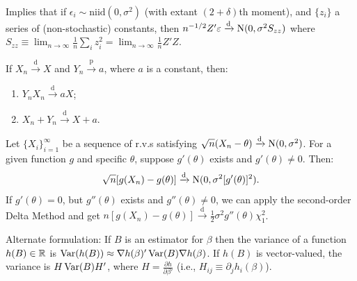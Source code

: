 \documentclass[8pt,letterpaper, landscape]{extarticle} %
\begin{document}
\begin{multicols}{3}
\begin{description}
Implies that if $ \epsilon_i \sim \text{niid} (0 , \sigma^2) $ (with extant $ (2 + \delta ) $th moment), and $ \{ z_i \} $ a series of (non-stochastic) constants, then $ n^{-1/2} Z' \varepsilon \xrightarrow{\text{d}} \operatorname{N} (0 , \sigma^2 S_{zz} ) $ where $ S_{zz} \equiv \lim_{n \to \infty} \tfrac{1}{n} \sum_{i} z_i^2 = \lim_{n \to \infty} \tfrac{1}{n} Z' Z $.

 If $ X_n \xrightarrow{\text{d}} X $ and $ Y_n \xrightarrow{\text{p}} a $, where $ a $ is a constant, then:
\begin{enumerate}
\item $ Y_n X_n \xrightarrow{\text{d}} aX $;
\item $ X_n + Y_n \xrightarrow{\text{d}} X + a $.
\end{enumerate}

Let $ \{ X_i \}_{i=1}^{\infty} $ be a sequence of r.v.s satisfying $ \sqrt{n} (X_n - \theta) \xrightarrow{\text{d}} \operatorname{N} (0, \sigma^2) $. For a given function $ g $ and specific $ \theta $, suppose $ g'(\theta) $ exists and $ g'(\theta) \neq 0 $. Then:
$$ \sqrt{n} [g(X_n) - g(\theta )] \xrightarrow{\text{d}} \operatorname{N} (0, \sigma^2 [g' (\theta)]^2). $$
If $ g'(\theta) = 0 $, but $ g''(\theta) $ exists and $ g''(\theta) \neq 0 $, we can apply the second-order Delta Method and get
$ n [g(X_n) - g(\theta )] \xrightarrow{\text{d}} \tfrac{1}{2} \sigma^2 g''(\theta) \chi^2_1 $.

Alternate formulation: If $ B $ is an estimator for $ \beta $ then the variance of a function $ h(B) \in \mathbb{R} $ is $ \operatorname{Var} (h(B)) \approx \nabla h(\beta)' \operatorname{Var} (B) \nabla h(\beta) $. If $ h(B) $ is vector-valued, the variance is $ H \operatorname{Var} (B) H' $, where $ H = \frac{\partial h}{\partial \beta'} $ (i.e., $ H_{ij} \equiv \partial_{j} h_{i} (\beta)  $).


\end{description}
\end{multicols}
\end{document}
